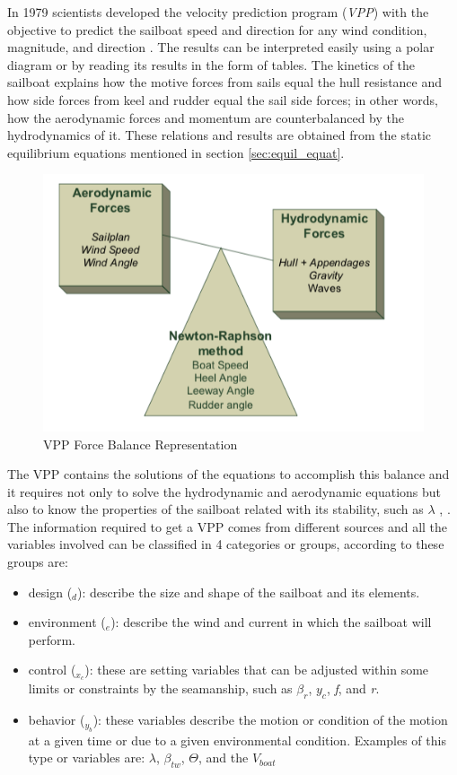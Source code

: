 In 1979 scientists developed the velocity prediction  program (\textit{VPP}) with the objective to predict the sailboat speed and direction for any wind condition, magnitude, and direction \cite{larsonprinciples}. The results can be interpreted easily using a polar diagram or by reading its results in the form of tables.  The kinetics of the sailboat explains how the motive forces from sails equal the hull resistance and how side forces from keel and rudder equal the sail side forces; in other words, how the aerodynamic forces and momentum are counterbalanced by the hydrodynamics of it. These relations and results are obtained from the static equilibrium equations mentioned in section \ref{sec:equil_equat}.\par 
\begin{figure}
    \centering
    \includegraphics[width=0.5\hsize]{images/Vpp_balance_eq.png}
    \caption{VPP Force Balance Representation \cite{bohm2014velocity} }
    \label{fig:my_label}
\end{figure}
The VPP contains the solutions of the equations to accomplish this balance and it requires not only to solve the hydrodynamic and aerodynamic equations but also to know the properties of the sailboat related with its stability, such as $\lambda$ \cite{larsonprinciples}, \cite{milgram1998fluid}. The information required to get a VPP comes from different sources and all the variables involved can be classified in 4 categories or groups, according to \cite{philpott1993yacht} these groups are:
\begin{itemize}
    \item design (\textit{$_{d}$}): describe the size and shape of the sailboat and its elements.
    \item environment (\textit{$_{e}$}): describe the wind and current in which the sailboat will perform.
    \item control (\textit{$_{x_{c}}$}): these are setting variables that can be adjusted within some limits or constraints by the seamanship, such as $\beta_{r}$, $y_{c}$, \textit{f}, and \textit{r}.
    \item behavior (\textit{$_{y_{b}}$}): these variables describe the motion or condition of the motion at a given time or due to a given environmental condition. Examples of this type or variables are: $\lambda$, $\beta_{tw}$, $\Theta$, and the $V_{boat}$
\end{itemize}

